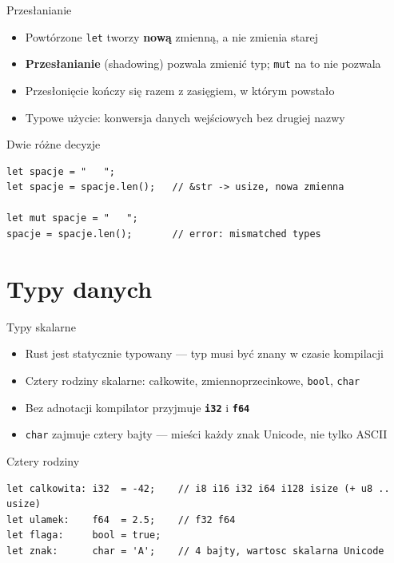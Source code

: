 \begin{frame}[fragile]{Przesłanianie}
  \begin{itemize}
    \item Powtórzone \texttt{let} tworzy \textbf{nową} zmienną, a nie zmienia starej
    \item \textbf{Przesłanianie} (shadowing) pozwala zmienić typ; \texttt{mut} na to nie pozwala
    \item Przesłonięcie kończy się razem z zasięgiem, w którym powstało
    \item Typowe użycie: konwersja danych wejściowych bez drugiej nazwy
  \end{itemize}
  \begin{block}{Dwie różne decyzje}
\begin{lstlisting}
let spacje = "   ";
let spacje = spacje.len();   // &str -> usize, nowa zmienna

let mut spacje = "   ";
spacje = spacje.len();       // error: mismatched types
\end{lstlisting}
  \end{block}
\end{frame}

\section{Typy danych}

\begin{frame}[fragile]{Typy skalarne}
  \begin{itemize}
    \item Rust jest statycznie typowany --- typ musi być znany w czasie kompilacji
    \item Cztery rodziny skalarne: całkowite, zmiennoprzecinkowe, \texttt{bool}, \texttt{char}
    \item Bez adnotacji kompilator przyjmuje \textbf{\texttt{i32}} i \textbf{\texttt{f64}}
    \item \texttt{char} zajmuje cztery bajty --- mieści każdy znak Unicode, nie tylko ASCII
  \end{itemize}
  \begin{block}{Cztery rodziny}
\begin{lstlisting}
let calkowita: i32  = -42;    // i8 i16 i32 i64 i128 isize (+ u8 .. usize)
let ulamek:    f64  = 2.5;    // f32 f64
let flaga:     bool = true;
let znak:      char = 'A';    // 4 bajty, wartosc skalarna Unicode
\end{lstlisting}
  \end{block}
\end{frame}

